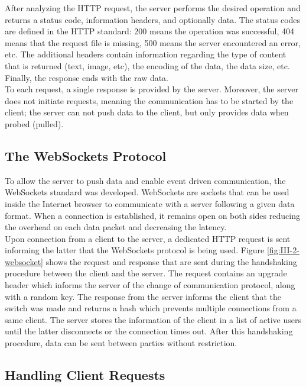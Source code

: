      After analyzing the HTTP request, the server performs the desired operation and returns a status code, information headers, and optionally data. The status codes are defined in the HTTP standard: 200 means the operation was successful, 404 means that the request file is missing, 500 means the server encountered an error, etc. The additional headers contain information regarding the type of content that is returned (text, image, etc), the encoding of the data, the data size, etc. Finally, the response ends with the raw data. \\

      To each request, a single response is provided by the server. Moreover, the server does not initiate requests, meaning the communication has to be started by the client; the server can not push data to the client, but only provides data when probed (pulled).

    \subsection{The WebSockets Protocol}

      To allow the server to push data and enable event driven communication, the WebSockets standard was developed. WebSockets are sockets that can be used inside the Internet browser to communicate with a server following a given data format. When a connection is established, it remains open on both sides reducing the overhead on each data packet and decreasing the latency. \\

      Upon connection from a client to the server, a dedicated HTTP request is sent informing the latter that the WebSockets protocol is being used. Figure \ref{fig:III-2-websocket} shows the request and response that are sent during the handshaking procedure between the client and the server. The request contains an upgrade header which informs the server of the change of communication protocol, along with a random key. The response from the server informs the client that the switch was made and returns a hash which prevents multiple connections from a same client. The server stores the information of the client in a list of active users until the latter disconnects or the connection times out. After this handshaking procedure, data can be sent between parties without restriction.

    \subsection{Handling Client Requests}

